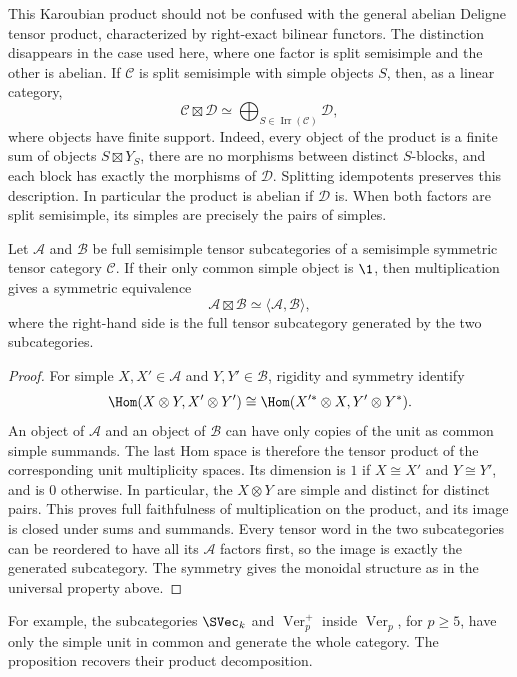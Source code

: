 \begin{remark}
This Karoubian product should not be confused with the general abelian
Deligne tensor product, characterized by right-exact bilinear functors.
The distinction disappears in the case used here, where one factor
is split semisimple and the other is abelian. If $\mathcal C$ is split
semisimple with simple objects $S$, then, as a linear category,
\[
 \mathcal C\boxtimes\mathcal D
 \simeq\bigoplus_{S\in\operatorname{Irr}(\mathcal C)}\mathcal D,
\]
where objects have finite support. Indeed, every object of the
product is a finite sum of objects $S\boxtimes Y_S$, there are no
morphisms between distinct $S$-blocks, and each block has exactly the
morphisms of $\mathcal D$. Splitting idempotents preserves this
description. In particular the product is abelian if $\mathcal D$ is.
When both factors are split semisimple, its simples are precisely
the pairs of simples.
\end{remark}

\begin{proposition}\label{prop:lec18-disjoint-product}
Let $\mathcal A$ and $\mathcal B$ be full semisimple tensor
subcategories of a semisimple symmetric tensor category $\mathcal C$.
If their only common simple object is $\1$, then multiplication gives
a symmetric equivalence
\[
 \mathcal A\boxtimes\mathcal B
 \simeq\langle\mathcal A,\mathcal B\rangle,
\]
where the right-hand side is the full tensor subcategory generated by
the two subcategories.
\end{proposition}
\begin{proof}
For simple $X,X'\in\mathcal A$ and $Y,Y'\in\mathcal B$, rigidity
and symmetry identify
\[
 \Hom(X\otimes Y,X'\otimes Y')
 \cong\Hom(X'^*\otimes X,Y'\otimes Y^*).
\]
An object of $\mathcal A$ and an object of $\mathcal B$ can have only
copies of the unit as common simple summands. The last Hom space is
therefore the tensor product of the corresponding unit multiplicity
spaces. Its dimension is $1$ if $X\cong X'$ and $Y\cong Y'$, and
is $0$ otherwise. In particular, the $X\otimes Y$ are simple and
distinct for distinct pairs. This proves full faithfulness of
multiplication on the product, and its image is closed under sums
and summands. Every tensor word in the two subcategories can be
reordered to have all its $\mathcal A$ factors first, so the image
is exactly the generated subcategory. The symmetry gives the
monoidal structure as in the universal property above.
\end{proof}

For example, the subcategories $\SVec_k$ and
$\operatorname{Ver}_p^+$ inside $\operatorname{Ver}_p$, for $p\geq5$,
have only the simple unit in common and generate the whole category.
The proposition recovers their product decomposition.

